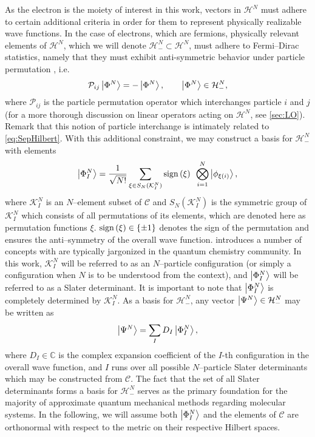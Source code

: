 As the electron is the moiety of interest in this work, vectors in $\mathcal{H}^N$ must adhere to certain additional 
criteria in order for them to represent physically realizable wave functions. In the case of electrons, which are 
fermions, physically relevant elements of $\mathcal{H}^N$, which we will denote $\mathcal{H}^N_- \subset \mathcal{H}^N$, must 
adhere to Fermi--Dirac statistics, namely that they must exhibit anti-symmetric behavior under particle permutation
\cite{Walecka12_book,Schuck04_book}, i.e.
\begin{equation}
  \label{eq:FermiDirac}
  \mathcal{P}_{ij} \left\vert \Phi^N \right\rangle = -\left\vert \Phi^N \right\rangle, \qquad \left\vert \Phi^N \right\rangle \in \mathcal{H}^N_-,
\end{equation} 
where $\mathcal{P}_{ij}$ is the particle permutation operator which interchanges particle $i$ and $j$ 
(for a more thorough discussion on linear operators acting on $\mathcal{H}^N$, see \cref{sec:LO}). Remark
that this notion of particle interchange is intimately related to \cref{eq:SepHilbert}. With this additional
constraint, we may construct a basis for $\mathcal{H}^N_-$ with elements
\begin{equation}
  \label{eq:SlaterDet}
  \left\vert \Phi^N_I \right\rangle = \frac{1}{\sqrt{N!}} \sum_{\xi \in S_N(\mathcal{K}^N_I)} \mathrm{sign}\left( \xi \right) \text{ } \bigotimes_{i = 1 }^N \left\vert \phi_{\xi(i)} \right\rangle,
\end{equation}
where $\mathcal{K}_I^N$ is an $N$--element subset of $\mathcal{C}$ and $S_N(\mathcal{K}_I^N)$ is the symmetric group
of $\mathcal{K}_I^N$ which consists of all permutations of its elements, which are denoted here as permutation
functions $\xi$. $\mathrm{sign}\left( \xi \right) \in \{ \pm 1 \}$ denotes the sign of the permutation and ensures the anti--symmetry of
the overall wave function.  introduces a number of concepts with are typically jargonized 
in the quantum chemistry community. In this work, $\mathcal{K}_I^N$ will be referred to as an $N$--particle
configuration (or simply a configuration when $N$ is to be understood from the context), and $\left\vert \Phi^N_I \right\rangle$
will be referred to as a Slater determinant. It is important to note that $\left\vert \Phi^N_I \right\rangle$ is completely 
determined by $\mathcal{K}_I^N$. As a basis for $\mathcal{H}^N_-$, any vector $\left\vert \Psi^N \right\rangle \in \mathcal{H}^N_-$
may be written as \cite{Ostlund12_book}
\begin{equation}
\left\vert \Psi^N \right\rangle = \sum_I D_I \left\vert \Phi^N_I \right\rangle,
\end{equation}
where $D_I\in\mathbb C$ is the complex expansion coefficient of the $I$-th configuration in the overall wave function,
and $I$ runs over all possible $N$--particle Slater determinants which may be constructed from $\mathcal{C}$.
The fact that the set of all Slater determinants forms a basis for $\mathcal{H}^N_-$
serves as the primary foundation for the majority of approximate quantum mechanical methods regarding molecular
systems. In the following, we will assume both $\left\vert \Phi^N_I \right\rangle$ and the elements of $\mathcal{C}$ are orthonormal
with respect to the metric on their respective Hilbert spaces.

